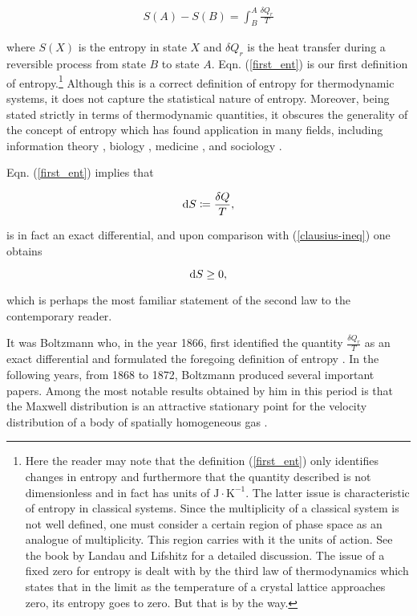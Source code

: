 \begin{align}\label{first_ent}
  S(A) - S(B) = \int^A_B \frac{\delta Q_r}{T}
\end{align}

where $S(X)$ is the entropy in state $X$ and $\delta Q_r$ is the heat transfer during a reversible process from state $B$ to state $A$. Eqn. (\ref{first_ent}) is our first definition of entropy.\footnote{Here the reader may note that the definition (\ref{first_ent}) only identifies changes in entropy and furthermore that the quantity described is not dimensionless and in fact has units of $\text{J}\cdot\text{K}^{-1}$. The latter issue is characteristic of entropy in classical systems. Since the multiplicity of a classical system is not well defined, one must consider a certain region of phase space as an analogue of multiplicity. This region carries with it the units of action. See the book by Landau and Lifshitz \cite{landau2013statistical} for a detailed discussion. The issue of a fixed zero for entropy is dealt with by the third law of thermodynamics which states that in the limit as the temperature of a crystal lattice approaches zero, its entropy goes to zero. But that is by the way.} Although this is a correct definition of entropy for thermodynamic systems, it does not capture the statistical nature of entropy. Moreover, being stated strictly in terms of thermodynamic quantities, it obscures the generality of the concept of entropy which has found application in many fields, including information theory \cite{ShannonCommunication}, biology \cite{schrodinger2012life}, medicine \cite{bein2006entropy}, and sociology \cite{BaileyKennethD2006Lsta}.

Eqn. (\ref{first_ent}) implies that

\begin{equation}\label{therm_entropy}
  \mathrm{d} S \coloneqq \frac{\delta Q}{T},
\end{equation}

is in fact an exact differential, and upon comparison with (\ref{clausius-ineq}) one obtains

\begin{equation}\label{unbalanced}
  \mathrm{d} S \geq 0,
\end{equation}

which is perhaps the most familiar statement of the second law to the contemporary reader.

It was Boltzmann who, in the year 1866, first identified the quantity $\frac{\delta Q_r}{T}$ as an exact differential and formulated the foregoing definition of entropy \cite{sep-statphys-Boltzmann, Cercignani1998-CERLBT-2}. In the following years, from 1868 to 1872, Boltzmann produced several important papers. Among the most notable results obtained by him in this period is that the Maxwell distribution is an attractive stationary point for the velocity distribution of a body of spatially homogeneous gas \cite{sep-statphys-Boltzmann, Cercignani1998-CERLBT-2}.

